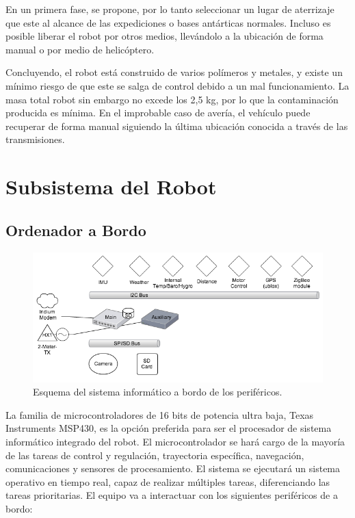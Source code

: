 \documentclass[a4paper,12pt]{article}
\begin{document}
En un primera fase, se propone, por lo tanto seleccionar un lugar de aterrizaje que este al alcance de las expediciones o bases antárticas normales. Incluso es posible liberar el robot por otros medios, llevándolo a la ubicación de forma manual o por medio de helicóptero.

Concluyendo, el robot está construido de varios polímeros y metales, y existe un mínimo  riesgo de que este se salga de control debido a un mal funcionamiento. La masa total robot sin embargo no excede los 2,5 kg, por lo que la contaminación producida es mínima. En el improbable caso de avería, el vehículo puede recuperar de forma manual siguiendo la última ubicación conocida a través de las transmisiones.




\section{Subsistema del Robot}

\subsection{Ordenador a Bordo}
\begin{figure}[h!]
	\centering
    \includegraphics[width=1\textwidth]{schema}
    \caption{Esquema del sistema informático a bordo de los periféricos.}
\end{figure} 
La familia de microcontroladores de 16 bits de potencia ultra baja, Texas Instruments MSP430, es la opción preferida para ser el procesador de sistema informático integrado del robot. El microcontrolador se hará cargo de la mayoría de las tareas de control y regulación, trayectoria específica, navegación, comunicaciones y sensores de procesamiento. El sistema se ejecutará un sistema operativo en tiempo real, capaz de realizar múltiples tareas, diferenciando las tareas prioritarias. El equipo va a interactuar con los siguientes periféricos de a bordo:
\end{document}
